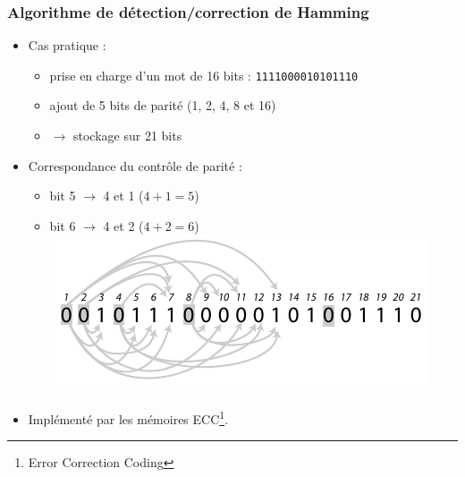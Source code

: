 \begin{frame}
\frametitle{Algorithme de détection/correction de Hamming}
\begin{itemize}
\item Cas pratique \cite{tanen} :
\begin{itemize}
\item prise en charge d'un mot de 16 bits : \texttt{1111000010101110}
\item ajout de 5 bits de parité (1, 2, 4, 8 et 16)
\item $\rightarrow$ stockage sur 21 bits
\end{itemize}
\item Correspondance du contrôle de parité :
\begin{itemize}
\item bit 5 $\rightarrow$ 4 et 1 ($4+1=5$)
\item bit 6 $\rightarrow$ 4 et 2 ($4+2=6$)
\includegraphics{../illustration/hamming_exemple.pdf}
\end{itemize}
\item Implémenté par les mémoires ECC\footnote{Error Correction Coding}.
\end{itemize}
\end{frame}


